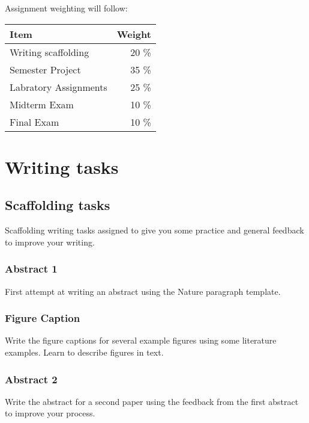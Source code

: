 \documentclass[11pt,]{article}
\begin{document}
Assignment weighting will follow:

\begin{tabular}{l|r}
\hline
Item & Weight\\
\hline
Writing scaffolding & 20 \%\\
\hline
Semester Project & 35 \%\\
\hline
Labratory Assignments & 25 \%\\
\hline
Midterm Exam & 10 \%\\
\hline
Final Exam & 10 \%\\
\hline
\end{tabular}

\newpage

\hypertarget{writing-tasks}{%
\section{Writing tasks}\label{writing-tasks}}

\hypertarget{scaffolding-tasks}{%
\subsection{Scaffolding tasks}\label{scaffolding-tasks}}

Scaffolding writing tasks assigned to give you some practice and general
feedback to improve your writing.

\hypertarget{abstract-1}{%
\subsubsection{Abstract 1}\label{abstract-1}}

First attempt at writing an abstract using the Nature paragraph
template.

\hypertarget{figure-caption}{%
\subsubsection{Figure Caption}\label{figure-caption}}

Write the figure captions for several example figures using some
literature examples. Learn to describe figures in text.

\hypertarget{abstract-2}{%
\subsubsection{Abstract 2}\label{abstract-2}}

Write the abstract for a second paper using the feedback from the first
abstract to improve your process.
\end{document}

